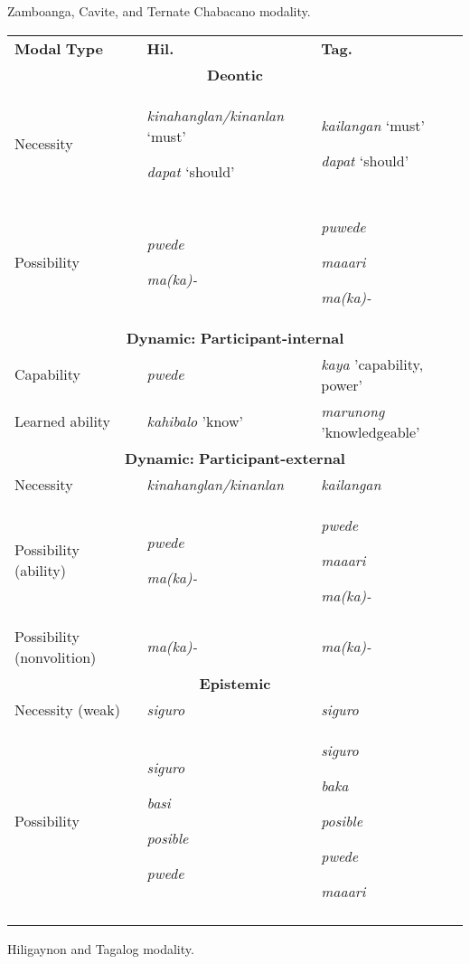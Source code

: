 \documentclass[output=paper]{langsci/langscibook}
\begin{document}
\begin{table}
\caption{Zamboanga, Cavite, and Ternate Chabacano modality.}
\label{tab:key:2}
\end{table}


\begin{tabularx}{\textwidth}{XXX}

\lsptoprule

\textbf{Modal} \textbf{Type} & \textbf{Hil.} & \textbf{Tag.}\\
\multicolumn{3}{c}{\textbf{Deontic}}\\
Necessity & \textit{kinahanglan/kinanlan} ‘must’

\textit{dapat} ‘should’ & \textit{kailangan} ‘must’

\textit{dapat} ‘should’\\
Possibility & \textit{pwede}

\textit{ma(ka)-} & \textit{puwede}

\textit{maaari}

\textit{ma(ka)-}\\
\multicolumn{3}{c}{\textbf{Dynamic:} \textbf{Participant-internal}}\\
Capability & \textit{pwede} & \textit{kaya} 'capability, power'\\
Learned ability & \textit{kahibalo} 'know' & \textit{marunong} 'knowledgeable'\\
\multicolumn{3}{c}{\textbf{Dynamic:} \textbf{Participant-external}}\\
Necessity & \textit{kinahanglan/kinanlan} & \textit{kailangan}\\
Possibility (ability) & \textit{pwede}

\textit{ma(ka)-} & \textit{pwede}

\textit{maaari}

\textit{ma(ka)-}\\
Possibility (nonvolition) & \textit{ma(ka)-} & \textit{ma(ka)-}\\
\multicolumn{3}{c}{\textbf{Epistemic}}\\
Necessity (weak) & \textit{siguro} & \textit{siguro} \\
Possibility & \textit{siguro}

\textit{basi} 

\textit{posible}

\textit{pwede} & \textit{siguro}

\textit{baka} 

\textit{posible}

\textit{pwede}

\textit{maaari}\\
\lspbottomrule
\end{tabularx}
\begin{table}
\caption{Hiligaynon and Tagalog modality.}
\label{tab:key:3}
\end{table}
\end{document}
